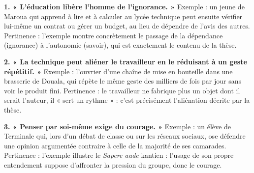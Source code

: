 \documentclass[11pt]{article}
\begin{document}
\begin{corrige}
\textbf{1. « L'éducation libère l'homme de l'ignorance. »} Exemple : un jeune de Maroua qui apprend à lire et à calculer au lycée technique peut ensuite vérifier lui-même un contrat ou gérer un budget, au lieu de dépendre de l'avis des autres. Pertinence : l'exemple montre concrètement le passage de la dépendance (ignorance) à l'autonomie (savoir), qui est exactement le contenu de la thèse.

\textbf{2. « La technique peut aliéner le travailleur en le réduisant à un geste répétitif. »} Exemple : l'ouvrier d'une chaîne de mise en bouteille dans une brasserie de Douala, qui répète le même geste des milliers de fois par jour sans voir le produit fini. Pertinence : le travailleur ne fabrique plus un objet dont il serait l'auteur, il « sert un rythme » : c'est précisément l'aliénation décrite par la thèse.

\textbf{3. « Penser par soi-même exige du courage. »} Exemple : un élève de Terminale qui, lors d'un débat de classe ou sur les réseaux sociaux, ose défendre une opinion argumentée contraire à celle de la majorité de ses camarades. Pertinence : l'exemple illustre le \emph{Sapere aude} kantien : l'usage de son propre entendement suppose d'affronter la pression du groupe, donc le courage.
\end{corrige}
\end{document}
